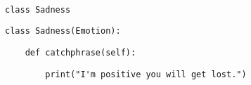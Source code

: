 \newpage
\begin{blocksection}

\begin{lstlisting}

class Sadness
\end{lstlisting}
\begin{solution}[0in]



\begin{lstlisting}
class Sadness(Emotion):
\end{lstlisting}
\end{solution}

\begin{lstlisting}
    def catchphrase(self):
\end{lstlisting}
\begin{solution}[0.55in]
\begin{lstlisting}
        print("I'm positive you will get lost.")
\end{lstlisting}
\end{solution}
\end{blocksection}
